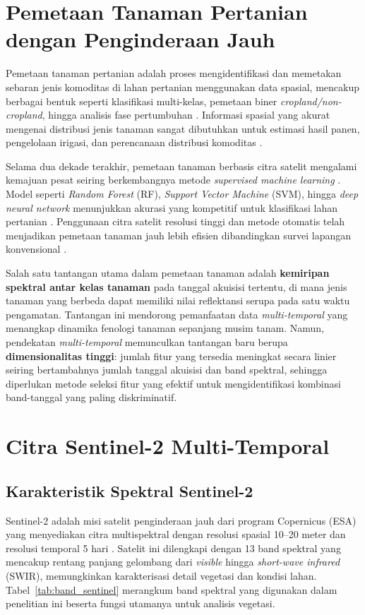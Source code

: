 \section{Pemetaan Tanaman Pertanian dengan Penginderaan Jauh}
Pemetaan tanaman pertanian adalah proses mengidentifikasi dan memetakan sebaran jenis komoditas di lahan pertanian menggunakan data spasial, mencakup berbagai bentuk seperti klasifikasi multi-kelas, pemetaan biner \textit{cropland/non-cropland}, hingga analisis fase pertumbuhan \citep{alamimachichi2023}.
Informasi spasial yang akurat mengenai distribusi jenis tanaman sangat dibutuhkan untuk estimasi hasil panen, pengelolaan irigasi, dan perencanaan distribusi komoditas \citep{gao2023}.

Selama dua dekade terakhir, pemetaan tanaman berbasis citra satelit mengalami kemajuan pesat seiring berkembangnya metode \textit{supervised machine learning} \citep{weiss2020}.
Model seperti \textit{Random Forest} (RF), \textit{Support Vector Machine} (SVM), hingga \textit{deep neural network} menunjukkan akurasi yang kompetitif untuk klasifikasi lahan pertanian \citep{zhao2020}.
Penggunaan citra satelit resolusi tinggi dan metode otomatis telah menjadikan pemetaan tanaman jauh lebih efisien dibandingkan survei lapangan konvensional \citep{alamimachichi2023}.

Salah satu tantangan utama dalam pemetaan tanaman adalah \textbf{kemiripan spektral antar kelas tanaman} pada tanggal akuisisi tertentu, di mana jenis tanaman yang berbeda dapat memiliki nilai reflektansi serupa pada satu waktu pengamatan.
Tantangan ini mendorong pemanfaatan data \textit{multi-temporal} yang menangkap dinamika fenologi tanaman sepanjang musim tanam.
Namun, pendekatan \textit{multi-temporal} memunculkan tantangan baru berupa \textbf{dimensionalitas tinggi}: jumlah fitur yang tersedia meningkat secara linier seiring bertambahnya jumlah tanggal akuisisi dan band spektral, sehingga diperlukan metode seleksi fitur yang efektif untuk mengidentifikasi kombinasi band-tanggal yang paling diskriminatif.

\section{Citra Sentinel-2 Multi-Temporal}
\subsection{Karakteristik Spektral Sentinel-2}
Sentinel-2 adalah misi satelit penginderaan jauh dari program Copernicus (ESA) yang menyediakan citra multispektral dengan resolusi spasial 10--20 meter dan resolusi temporal 5 hari \citep{phiri2020}.
Satelit ini dilengkapi dengan 13 band spektral yang mencakup rentang panjang gelombang dari \textit{visible} hingga \textit{short-wave infrared} (SWIR), memungkinkan karakterisasi detail vegetasi dan kondisi lahan.
Tabel~\ref{tab:band_sentinel} merangkum band spektral yang digunakan dalam penelitian ini beserta fungsi utamanya untuk analisis vegetasi.

